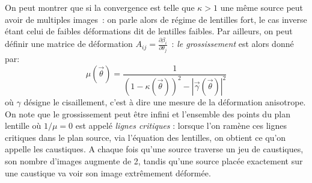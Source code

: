 On peut montrer que si la convergence est telle que $\kappa >1$ une même source peut avoir de multiples images~: on parle alors de régime de lentilles fort, le cas inverse étant celui de faibles déformations dit de lentilles faibles. Par ailleurs, on peut définir une matrice de déformation $A_{ij}=\frac{\partial \beta_i}{\partial \theta_j}$~: \textit{le grossissement} est alors donné par:
\begin{equation}
\mu(\vec{\theta})=\frac{1}{(1-\kappa(\vec{\theta}))^2 - |\vec{\gamma}(\vec{\theta})|^2}
\end{equation} 
où $\gamma$ désigne le cisaillement, c'est à dire une mesure de la déformation anisotrope. On note que le grossissement peut être infini et l'ensemble des points du plan lentille où $1/\mu=0$ est appelé \textit{lignes critiques} : lorsque l'on ramène ces lignes critiques dans le plan source, via l'équation des lentilles, on obtient ce qu'on appelle les caustiques. A chaque fois qu'une source traverse un jeu de caustiques, son nombre d'images augmente de 2, tandis qu'une source placée exactement sur une caustique va voir son image extrêmement déformée.

